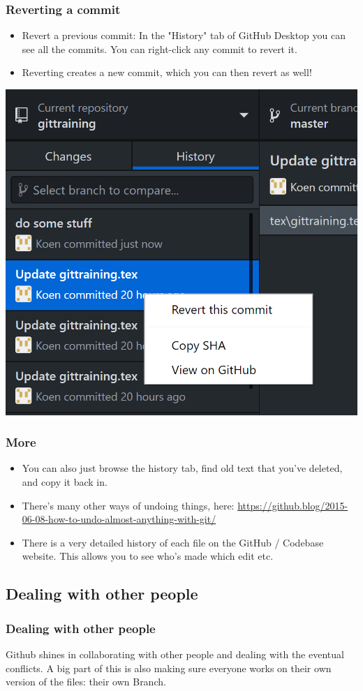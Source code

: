 \documentclass{beamer}
\begin{document}
\begin{frame}
	\frametitle{Reverting a commit}
	\begin{itemize}
		\item Revert a previous commit: In the "History" tab of GitHub Desktop you can see all the commits. You can right-click any commit to revert it. 
		\item Reverting creates a new commit, which you can then revert as well!
	\end{itemize}
	\hfill\includegraphics[width=0.5\linewidth]{figures/revertcommit.png}\hfill\strut


\end{frame}

\begin{frame}
	\frametitle{More}
	\begin{itemize}
		\item You can also just browse the history tab, find old text that you've deleted, and copy it back in.
		\item There's many other ways of undoing things, here: \url{https://github.blog/2015-06-08-how-to-undo-almost-anything-with-git/}
		\item There is a very detailed history of each file on the GitHub / Codebase website. This allows you to see who's made which edit etc.
	\end{itemize}
\end{frame}

\subsection{Dealing with other people}
\begin{frame}
\frametitle{Dealing with other people}
Github shines in collaborating with other people and dealing with the eventual conflicts. A big part of this is also making sure everyone works on their own version of the files: their own Branch.
\end{frame}
\end{document}
